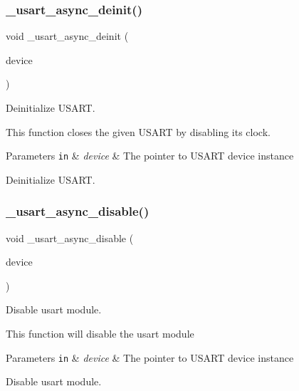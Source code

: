 \subsubsection{\texorpdfstring{\+\_\+usart\+\_\+async\+\_\+deinit()}{\_usart\_async\_deinit()}}
{\footnotesize\ttfamily void \+\_\+usart\+\_\+async\+\_\+deinit (\begin{DoxyParamCaption}\item[{struct \hyperlink{struct__usart__async__device}{\+\_\+usart\+\_\+async\+\_\+device} $\ast$const}]{device }\end{DoxyParamCaption})}



Deinitialize U\+S\+A\+RT. 

This function closes the given U\+S\+A\+RT by disabling its clock.


\begin{DoxyParams}[1]{Parameters}
\mbox{\tt in}  & {\em device} & The pointer to U\+S\+A\+RT device instance\\
\hline
\end{DoxyParams}
Deinitialize U\+S\+A\+RT. \mbox{\label{group___h_p_l_gadb6751e5c270eb88eb754f45e7b8a91f}} 
\subsubsection{\texorpdfstring{\+\_\+usart\+\_\+async\+\_\+disable()}{\_usart\_async\_disable()}}
{\footnotesize\ttfamily void \+\_\+usart\+\_\+async\+\_\+disable (\begin{DoxyParamCaption}\item[{struct \hyperlink{struct__usart__async__device}{\+\_\+usart\+\_\+async\+\_\+device} $\ast$const}]{device }\end{DoxyParamCaption})}



Disable usart module. 

This function will disable the usart module


\begin{DoxyParams}[1]{Parameters}
\mbox{\tt in}  & {\em device} & The pointer to U\+S\+A\+RT device instance\\
\hline
\end{DoxyParams}
Disable usart module. \mbox{\label{group___h_p_l_ga86c4101798d9dbc584f1e56615140d6f}} 
